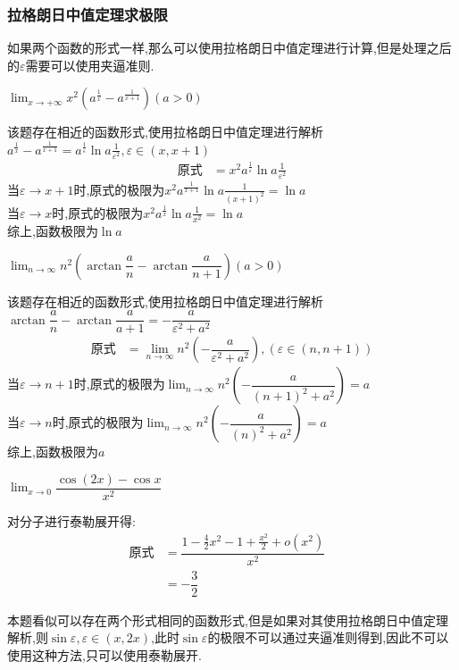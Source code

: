 \documentclass[8pt a4paper, oneside, UTF8]{ctexbook}
\begin{document}
\begin{sloppypar}
    \subsubsection{拉格朗日中值定理求极限}
    如果两个函数的形式一样,那么可以使用拉格朗日中值定理进行计算,但是处理之后的$\varepsilon$需要可以使用夹逼准则.
    \begin{problem}
    $\lim_{x\to+\infty}x^{2}\left(a^{\frac{1}{x}}-a^{\frac{1}{x+1}}\right)\left(a>0\right)$
    \end{problem}
    \begin{solution}
        该题存在相近的函数形式,使用拉格朗日中值定理进行解析$a^{\frac{1}{x}}-a^{\frac{1}{x+1}}=a^{\frac{1}{\varepsilon}}\ln a\frac{1}{\varepsilon ^2},\varepsilon \in (x,x+1)$
        \begin{align*}
            \text{原式} & = x^2 a^{\frac{1}{\varepsilon}}\ln a\frac{1}{\varepsilon ^2}
        \end{align*}
        当$\varepsilon \to x+1$时,原式的极限为$x^2 a^{\frac{1}{x+1}}\ln a \frac{1}{(x+1)^2}=\ln a$\\
        当$\varepsilon \to x$时,原式的极限为$x^2 a^{\frac{1}{x}}\ln a \frac{1}{x^2}=\ln a$\\
        综上,函数极限为$\ln a$
    \end{solution}
    \begin{problem}
    $\lim_{n\to\infty}n^{2}\left(\arctan\dfrac{a}{n}-\arctan\dfrac{a}{n+1}\right)\left(a>0\right)$
    \end{problem}
    \begin{solution}
        该题存在相近的函数形式,使用拉格朗日中值定理进行解析$\arctan \dfrac{a}{n}-\arctan \dfrac{a}{a+1}=-\dfrac{a}{ \varepsilon^2 +a^2}$
        \begin{align*}
            \text{原式} & =\lim_{n\to \infty} n^2(-\dfrac{a}{\varepsilon^2+a^2}),(\varepsilon \in (n,n+1) )
        \end{align*}
        当$\varepsilon \to n+1$时,原式的极限为$\lim_{n\to \infty} n^2(-\dfrac{a}{(n+1)^2+a^2})=a$\\
        当$\varepsilon \to n$时,原式的极限为$\lim_{n\to \infty}n^2(-\dfrac{a}{(n)^2+a^2})=a$\\
        综上,函数极限为$a$
    \end{solution}
    \begin{problem}
    $\lim_{x\to 0}\dfrac{\cos(2x)-\cos x}{x^2}$
    \end{problem}
    \begin{solution}
        对分子进行泰勒展开得:
        \begin{align*}
            \text{原式} & = \dfrac{1-\frac{4}{2}x^2-1+\frac{x^2}{2}+o(x^2)}{x^2} & \\
                      & = -\dfrac{3}{2}
        \end{align*}
    \end{solution}
    \begin{note}
        本题看似可以存在两个形式相同的函数形式,但是如果对其使用拉格朗日中值定理解析,则$\sin \varepsilon,\varepsilon \in (x,2x)$,此时$\sin \varepsilon$的极限不可以通过夹逼准则得到,因此不可以使用这种方法,只可以使用泰勒展开.
    \end{note}

\end{sloppypar}
\end{document}
